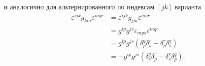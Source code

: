 \documentclass[12pt,a4paper]{article}
\begin{document}
        и аналогично для альтернированного по индексам $[jk]$ варианта
        \begin{equation}\begin{aligned}
           \varepsilon^{ijk} g_{km} \varepsilon^{mqr}
                &= \varepsilon^{ijk} g_{jm} \varepsilon^{mqr} \\
                &= g^{ip} g^{js} \varepsilon_{mps} \varepsilon^{mqr} \\
                &= g^{ip} g^{js} \left(
                    \delta_p^q \delta_s^r - \delta_p^r \delta_s^q
                \right) \\
                &= - g^{ip} g^{js} \left(
                    \delta_s^q \delta_p^r - \delta_s^r \delta_p^q
                \right).
        \end{aligned}\end{equation}
\end{document}
